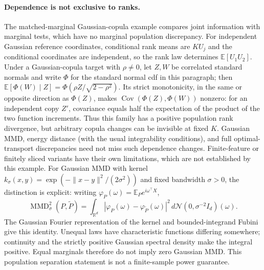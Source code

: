 {\paragraph{Dependence is not exclusive to ranks.}
The matched-marginal Gaussian-copula example compares joint information with marginal tests, which have no marginal population discrepancy. For independent Gaussian reference coordinates, conditional rank means are $KU_j$ and the conditional coordinates are independent, so the rank law determines $\mathbb E[U_1U_2]$. Under a Gaussian-copula target with $\rho\ne0$, let $Z,W$ be correlated standard normals and write $\Phi$ for the standard normal cdf in this paragraph; then $\mathbb E[\Phi(W)\mid Z]=\Phi(\rho Z/\sqrt{2-\rho^2})$. Its strict monotonicity, in the same or opposite direction as $\Phi(Z)$, makes $\operatorname{Cov}(\Phi(Z),\Phi(W))$ nonzero: for an independent copy $Z'$, covariance equals half the expectation of the product of the two function increments. Thus this family has a positive population rank divergence, but arbitrary copula changes can be invisible at fixed $K$. Gaussian MMD, energy distance (with the usual integrability conditions), and full optimal-transport discrepancies need not miss such dependence changes. Finite-feature or finitely sliced variants have their own limitations, which are not established by this example. For Gaussian MMD with kernel $k_\sigma(x,y)=\exp(-\|x-y\|^2/(2\sigma^2))$ and fixed bandwidth $\sigma>0$, the distinction is explicit: writing $\varphi_P(\omega)=\mathbb E_P e^{i\omega^\top X}$,
\[
\operatorname{MMD}_{\sigma}^2(P,\widetilde P)=
\int_{\mathbb R^d}|\varphi_P(\omega)-\varphi_{\widetilde P}(\omega)|^2\,
 d\mathcal N(0,\sigma^{-2}I_d)(\omega).
\]
The Gaussian Fourier representation of the kernel and bounded-integrand Fubini give this identity. Unequal laws have characteristic functions differing somewhere; continuity and the strictly positive Gaussian spectral density make the integral positive. Equal marginals therefore do not imply zero Gaussian MMD. This population separation statement is not a finite-sample power guarantee.
}
